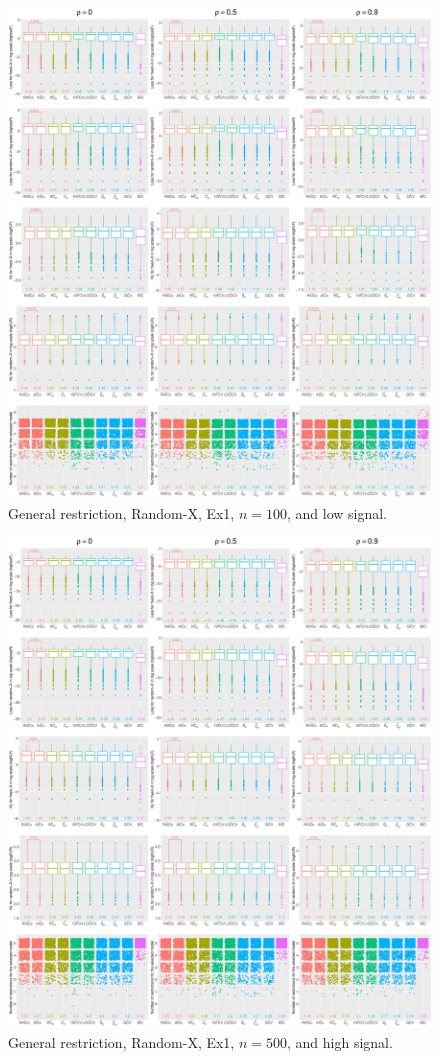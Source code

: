 \begin{figure}[!ht]
\centering
\includegraphics[width=\textwidth]{figures/supplement/randomx/general_restriction/Ex1_n100_lsnr.eps}
\caption{General restriction, Random-X, Ex1, $n=100$, and low signal.}
\end{figure}
\clearpage
\begin{figure}[!ht]
\centering
\includegraphics[width=\textwidth]{figures/supplement/randomx/general_restriction/Ex1_n500_hsnr.eps}
\caption{General restriction, Random-X, Ex1, $n=500$, and high signal.}
\end{figure}
